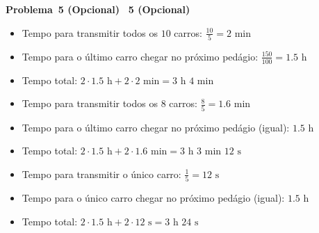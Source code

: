 \documentclass{article}
\newcounter{exe-list}
\newenvironment{exe-list}
    {\begin{list}{\alph{exe-list}.}{\usecounter{exe-list}}}
    {\end{list}}
\newenvironment{exe}[2][]
    {\newcommand{\opt}{(Opcional)}%
    \newcommand{\sketch}[1]{{\bfseries Rascunho:} ##1}%
    \newcommand{\nop}{\hspace{-1ex}}%
    \medskip\par\noindent\ifthenelse{\equal{#1}{}}
        {\textbf{\large Problema~#2}}
        {\textbf{\large #1~#2}}%
    \medskip\par\noindent}
    {\medskip}
\begin{document}
\begin{exe}{5 \opt}
    \begin{exe-list}
    \item \begin{itemize}
        \item Tempo para transmitir todos os \(10\) carros:
            \( \frac{10}{5} = 2 \text{ min} \)
        \item Tempo para o último carro chegar no próximo pedágio:
            \( \frac{150}{100} = 1.5 \text{ h} \)
        \item Tempo total:
            \( 2 \cdot 1.5 \text{ h} + 2 \cdot 2 \text{ min}
                = 3 \text{ h } 4 \text{ min } \)
    \end{itemize}
    \item \begin{itemize}
        \item Tempo para transmitir todos os \(8\) carros:
            \( \frac{8}{5} = 1.6 \text{ min} \)
        \item Tempo para o último carro chegar no próximo pedágio
            (igual): \( 1.5 \text{ h} \)
        \item Tempo total:
            \( 2 \cdot 1.5 \text{ h} + 2 \cdot 1.6 \text{ min}
                = 3 \text{ h } 3 \text{ min } 12 \text{ s } \)
    \end{itemize}
    \item \begin{itemize}
        \item Tempo para transmitir o único carro:
            \( \frac{1}{5} = 12 \text{ s} \)
        \item Tempo para o único carro chegar no próximo pedágio
            (igual): \( 1.5 \text{ h} \)
        \item Tempo total:
            \( 2 \cdot 1.5 \text{ h} + 2 \cdot 12 \text{ s}
                = 3 \text{ h } 24 \text{ s } \)
    \end{itemize}
    \end{exe-list}
\end{exe}
\end{document}
